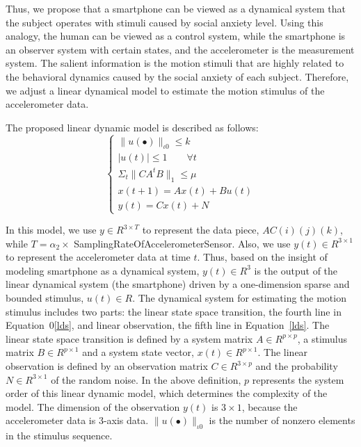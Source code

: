 Thus, we propose that a smartphone can be viewed as a dynamical system that the subject operates with stimuli caused by social anxiety level. Using this analogy, the human can be viewed as a control system, while the smartphone is an observer system with certain states, and the accelerometer is the measurement system. The salient information is the motion stimuli that are highly related to the behavioral dynamics caused by the social anxiety of each subject. Therefore, we adjust a linear dynamical model to estimate the motion stimulus of the accelerometer data.



The proposed linear dynamic model is described as follows:
\begin{equation}
\label{lds}
\begin{cases}
  \parallel u(\bullet)\parallel_{\iota 0}  \leq  k  \\
  |u(t)| \leq 1 \qquad \forall t  \\
  \Sigma_{t} \parallel CA^{t}B \parallel_{1} \leq \mu  \\
  x(t+1) = Ax(t)+Bu(t)\\
  y(t)=Cx(t) + N
\end{cases}
\end{equation}

In this model, we use $y\in R^{3 \times T}$ to represent the data piece, $AC(i)(j)(k)$, while $T = \alpha_{2} \times$ SamplingRateOfAccelerometerSensor. Also, we use $y(t)\in R^{3 \times 1}$ to represent the accelerometer data at  time $t$. Thus, based on the insight of modeling smartphone as a dynamical system, $y(t)\in R^{3}$ is the output of the linear dynamical system (the smartphone) driven by a one-dimension sparse and bounded stimulus, $u(t)\in R$. The dynamical system for estimating the motion stimulus includes two parts: the linear state space transition, the fourth line in Equation~0\ref{lds}, and linear observation, the fifth line in Equation~\ref{lds}.
The linear state space transition is defined by a system matrix $A \in R^{p \times p}$, a stimulus matrix $B \in R^{p \times 1}$ and a system state vector, $x(t) \in R^{p \times 1}$. The linear observation is defined by an observation matrix $C \in R^{3 \times p}$ and the probability $N \in R^{3 \times 1}$ of the random noise. In the above definition, $p$ represents the system order of this linear dynamic model, which determines the complexity  of the model.
The dimension of the observation  $y(t)$ is $3 \times 1$, because the accelerometer data is 3-axis data.
$\parallel u(\bullet)\parallel_{\iota 0} $ is the number of nonzero elements in the stimulus sequence. 

